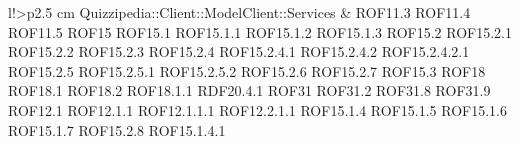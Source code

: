 \begin{tabella}{l!{\VRule}>{\centering\arraybackslash}p{2.5 cm}}
Quizzipedia::Client::ModelClient::Services & ROF11.3 \linebreak ROF11.4 \linebreak ROF11.5 \linebreak ROF15 \linebreak ROF15.1 \linebreak ROF15.1.1 \linebreak ROF15.1.2 \linebreak ROF15.1.3 \linebreak ROF15.2 \linebreak ROF15.2.1 \linebreak ROF15.2.2 \linebreak ROF15.2.3 \linebreak ROF15.2.4 \linebreak ROF15.2.4.1 \linebreak ROF15.2.4.2 \linebreak ROF15.2.4.2.1 \linebreak ROF15.2.5 \linebreak ROF15.2.5.1 \linebreak ROF15.2.5.2 \linebreak ROF15.2.6 \linebreak ROF15.2.7 \linebreak ROF15.3 \linebreak ROF18 \linebreak ROF18.1 \linebreak ROF18.2 \linebreak ROF18.1.1 \linebreak RDF20.4.1 \linebreak ROF31 \linebreak ROF31.2 \linebreak ROF31.8 \linebreak ROF31.9 \linebreak ROF12.1 \linebreak ROF12.1.1 \linebreak ROF12.1.1.1 \linebreak ROF12.2.1.1 \linebreak ROF15.1.4 \linebreak ROF15.1.5 \linebreak ROF15.1.6 \linebreak ROF15.1.7 \linebreak ROF15.2.8 \linebreak ROF15.1.4.1 \\

\end{tabella}
